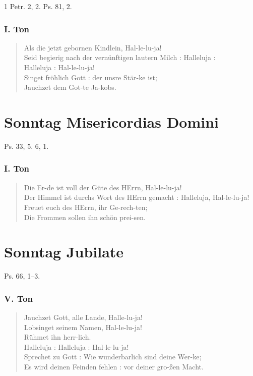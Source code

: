 1 Petr. 2, 2. Ps. 81, 2.

\subsubsection{I. Ton}
\begin{verse}
Als die jetzt gebornen Kindlein, Hal-le-lu-ja!\\
Seid begierig nach der vernünftigen lautern Milch : Halleluja :\\
Halleluja : Hal-le-lu-ja!\\
Singet fröhlich Gott : der unsre Stär-ke ist;\\
Jauchzet dem Got-te Ja-kobs.
\end{verse}

\section{Sonntag Misericordias Domini}

Ps. 33, 5. 6, 1.

\subsubsection{I. Ton}
\begin{verse}
Die Er-de ist voll der Güte des HErrn, Hal-le-lu-ja!\\
Der Himmel ist durchs Wort des HErrn gemacht : Halleluja, Hal-le-lu-ja!\\
Freuet euch des HErrn, ihr Ge-rech-ten;\\
Die Frommen sollen ihn schön prei-sen.
\end{verse}

\section{Sonntag Jubilate}

Ps. 66, 1–3.

\subsubsection{V. Ton}
\begin{verse}
Jauchzet Gott, alle Lande, Halle-lu-ja!\\
Lobsinget seinem Namen, Hal-le-lu-ja!\\
Rühmet ihn herr-lich.\\
Halleluja : Halleluja : Hal-le-lu-ja!\\
Sprechet zu Gott : Wie wunderbarlich sind deine Wer-ke;\\
Es wird deinen Feinden fehlen : vor deiner gro-ßen Macht.
\end{verse}

